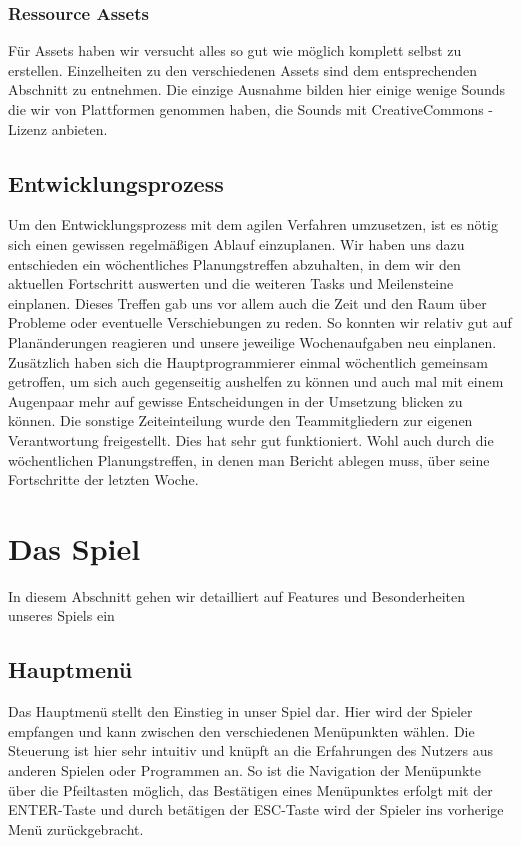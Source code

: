 \documentclass[10pt]{article}
\begin{document}
\subsubsection{Ressource Assets}
Für Assets haben wir versucht alles so gut wie möglich komplett selbst zu erstellen. Einzelheiten zu den verschiedenen Assets sind dem entsprechenden Abschnitt zu entnehmen.
Die einzige Ausnahme bilden hier einige wenige Sounds die wir von Plattformen genommen haben, die Sounds mit CreativeCommons - Lizenz anbieten. 

\vspace{0.5cm}
\subsection{Entwicklungsprozess}
Um den Entwicklungsprozess mit dem agilen Verfahren umzusetzen, ist es nötig sich einen gewissen regelmäßigen Ablauf einzuplanen. \newline
Wir haben uns dazu entschieden ein wöchentliches Planungstreffen abzuhalten,
in dem wir den aktuellen Fortschritt auswerten und die weiteren Tasks und Meilensteine einplanen. Dieses Treffen gab uns vor allem auch die Zeit und den Raum über Probleme oder eventuelle Verschiebungen zu reden. So konnten wir relativ gut auf Planänderungen reagieren und unsere jeweilige Wochenaufgaben neu einplanen. \newline
Zusätzlich haben sich die Hauptprogrammierer einmal wöchentlich gemeinsam getroffen, um sich auch gegenseitig aushelfen zu können und auch mal mit einem Augenpaar mehr auf gewisse Entscheidungen in der Umsetzung blicken zu können.
Die sonstige Zeiteinteilung wurde den Teammitgliedern zur eigenen Verantwortung freigestellt. Dies hat sehr gut funktioniert. Wohl auch durch die wöchentlichen Planungstreffen, in denen man Bericht ablegen muss, über seine Fortschritte der letzten Woche.

\newpage
\section{Das Spiel}
In diesem Abschnitt gehen wir detailliert auf Features und Besonderheiten unseres Spiels ein

\vspace{0.5cm}
\subsection{Hauptmenü}

Das Hauptmenü stellt den Einstieg in unser Spiel dar. Hier wird der Spieler empfangen und kann zwischen den verschiedenen Menüpunkten wählen.
Die Steuerung ist hier sehr intuitiv und knüpft an die Erfahrungen des Nutzers aus anderen Spielen oder Programmen an. So ist die Navigation der Menüpunkte über die Pfeiltasten möglich, das Bestätigen eines Menüpunktes erfolgt mit der ENTER-Taste und durch betätigen der ESC-Taste wird der Spieler ins vorherige Menü zurückgebracht.
\end{document}

